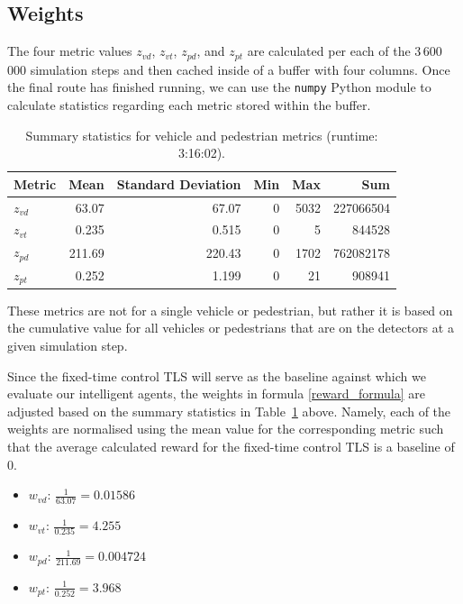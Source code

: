 \documentclass[a4paper]{report}
\begin{document}
\subsection{Weights}

The four metric values $z_{vd}$, $z_{vt}$, $z_{pd}$, and $z_{pt}$ are calculated per each of the 3\,600\,000 simulation steps and then cached inside of a buffer with four columns. Once the final route has finished running, we can use the \texttt{numpy} Python module to calculate statistics regarding each metric stored within the buffer.

\begin{table}[H]
  \centering
  \begin{tabular}{lrrrrr}
    \hline
    \textbf{Metric} & \textbf{Mean} & \textbf{Standard Deviation} & \textbf{Min} & \textbf{Max} & \textbf{Sum} \\
    \hline
    $z_{vd}$ & 63.07 & 67.07 & 0 & 5032 & 227066504 \\
    $z_{vt}$ & 0.235 & 0.515 & 0 & 5 & 844528 \\
    $z_{pd}$ & 211.69 & 220.43 & 0 & 1702 & 762082178 \\
    $z_{pt}$ & 0.252 & 1.199 & 0 & 21 & 908941 \\
    \hline
  \end{tabular}
  \caption{Summary statistics for vehicle and pedestrian metrics (runtime: 3:16:02).}
  \label{summary_statistics}
\end{table}

These metrics are not for a single vehicle or pedestrian, but rather it is based on the cumulative value for all vehicles or pedestrians that are on the detectors at a given simulation step.

Since the fixed-time control TLS will serve as the baseline against which we evaluate our intelligent agents, the weights in formula \eqref{reward_formula} are adjusted based on the summary statistics in Table~\ref{summary_statistics} above. Namely, each of the weights are normalised using the mean value for the corresponding metric such that the average calculated reward for the fixed-time control TLS is a baseline of 0.

\begin{itemize}
  \item $w_{vd}$: $\frac{1}{63.07}=0.01586$
  \item $w_{vt}$: $\frac{1}{0.235}=4.255$
  \item $w_{pd}$: $\frac{1}{211.69}=0.004724$
  \item $w_{pt}$: $\frac{1}{0.252}=3.968$
\end{itemize}
\end{document}
